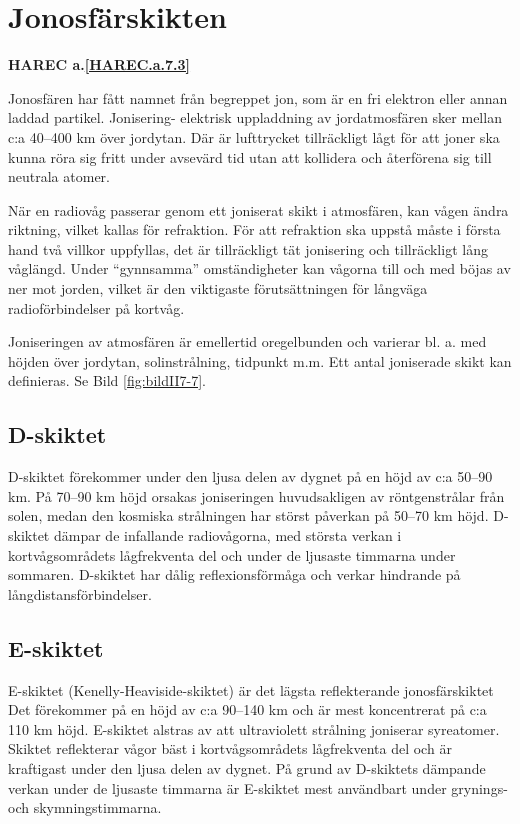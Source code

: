 \section{Jonosfärskikten}
\textbf{
HAREC a.\ref{HAREC.a.7.3}\label{myHAREC.a.7.3}
}

Jonosfären har fått namnet från begreppet jon, som är en fri elektron
eller annan laddad partikel. Jonisering- elektrisk uppladdning av
jordatmosfären sker mellan c:a 40--400 km över jordytan. Där är
lufttrycket tillräckligt lågt för att joner ska kunna röra sig fritt
under avsevärd tid utan att kollidera och återförena sig till neutrala
atomer.

När en radiovåg passerar genom ett joniserat skikt i atmosfären,
kan vågen ändra riktning, vilket kallas för refraktion. För att
refraktion ska uppstå måste i första hand två villkor uppfyllas, det
är tillräckligt tät jonisering och tillräckligt lång våglängd. Under
``gynnsamma'' omständigheter kan vågorna till och med böjas av ner mot
jorden, vilket är den viktigaste förutsättningen för långväga
radioförbindelser på kortvåg.

Joniseringen av atmosfären är emellertid oregelbunden och varierar
bl. a. med höjden över jordytan, solinstrålning, tidpunkt m.m.  Ett
antal joniserade skikt kan definieras.  Se Bild \ref{fig:bildII7-7}.

\subsection{D-skiktet}

D-skiktet förekommer under den ljusa delen av dygnet på en höjd av c:a
50--90 km. På 70--90 km höjd orsakas joniseringen huvudsakligen av
röntgenstrålar från solen, medan den kosmiska strålningen har störst
påverkan på 50--70 km höjd. D-skiktet dämpar de infallande
radiovågorna, med största verkan i kortvågsområdets lågfrekventa del
och under de ljusaste timmarna under sommaren.  D-skiktet har dålig
reflexionsförmåga och verkar hindrande på långdistansförbindelser.

\subsection{E-skiktet}

E-skiktet (Kenelly-Heaviside-skiktet) är det lägsta reflekterande
jonosfärskiktet Det förekommer på en höjd av c:a 90--140 km och är mest
koncentrerat på c:a 110 km höjd. E-skiktet alstras av att ultraviolett
strålning joniserar syreatomer. Skiktet reflekterar vågor bäst i
kortvågsområdets lågfrekventa del och är kraftigast under den ljusa
delen av dygnet. På grund av D-skiktets dämpande verkan under de
ljusaste timmarna är E-skiktet mest användbart under grynings- och
skymningstimmarna.

